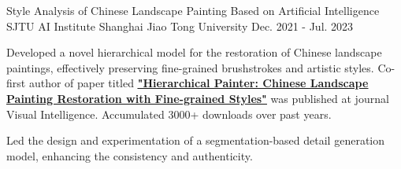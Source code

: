 \begin{cventries}
  \begin{cventry}
    {Style Analysis of Chinese Landscape Painting Based on Artificial Intelligence} %
    {SJTU AI Institute} %
    {Shanghai Jiao Tong University} %
    {Dec. 2021 - Jul. 2023} %
    {
      \begin{cvitems} %
      \item Developed a novel hierarchical model for the restoration of Chinese landscape paintings, effectively preserving fine-grained brushstrokes and artistic styles.
      Co-first author of paper titled \href{https://link.springer.com/content/pdf/10.1007/s44267-023-00021-y.pdf}{\underline{\textbf{"Hierarchical Painter: Chinese Landscape Painting Restoration with Fine-grained Styles"}}} was published at journal Visual Intelligence. Accumulated 3000+ downloads over past years.
      \item Led the design and experimentation of a segmentation-based detail generation model, enhancing the consistency and authenticity.
      \end{cvitems}
    }
  \end{cventry}
    

    
\end{cventries}

